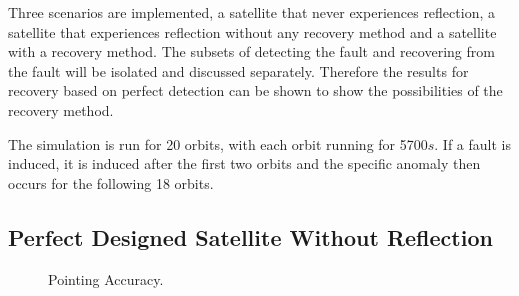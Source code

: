 \documentclass[letterpaper, 10 pt, conference]{ieeeconf}  %
\begin{document}
Three scenarios are implemented, a satellite that never experiences reflection, a satellite that experiences reflection without any recovery method and a satellite with a recovery method. The subsets of detecting the fault and recovering from the fault will be isolated and discussed separately. Therefore the results for recovery based on perfect detection can be shown to show the possibilities of the recovery method.

The simulation is run for 20 orbits, with each orbit running for 5700$s$. If a fault is induced, it is induced after the first two orbits and the specific anomaly then occurs for the following 18 orbits.

\newpage

\subsection{Perfect Designed Satellite Without Reflection}
\begin{figure}[!htb]
	\centering
	\caption[Pointing Accuracy]{Pointing Accuracy.}
	\label{fig:Pointing Accuracy None}
\end{figure}
\end{document}

